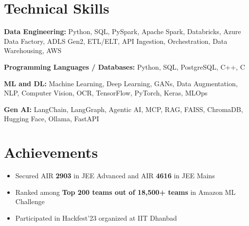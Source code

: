 \documentclass[a4paper,10pt]{article}
\begin{document}
\section{Technical Skills}

\small
\textbf{Data Engineering:}
Python, SQL, PySpark, Apache Spark, Databricks, Azure Data Factory, ADLS Gen2, ETL/ELT, API Ingestion, Orchestration, Data Warehousing, AWS

\vspace{2pt}

\textbf{Programming Languages / Databases:}
Python, SQL, PostgreSQL, C++, C

\vspace{2pt}

\textbf{ML and DL:}
Machine Learning, Deep Learning, GANs, Data Augmentation, NLP, Computer Vision, OCR, TensorFlow, PyTorch, Keras, MLOps

\vspace{2pt}

\textbf{Gen AI:}
LangChain, LangGraph, Agentic AI, MCP, RAG, FAISS, ChromaDB, Hugging Face, Ollama, FastAPI

\section{Achievements}

\begin{itemize}[leftmargin=0.18in,itemsep=2pt]
\item Secured AIR \textbf{2903} in JEE Advanced and AIR \textbf{4616} in JEE Mains
\item Ranked among \textbf{Top 200 teams out of 18,500+ teams} in Amazon ML Challenge
\item Participated in Hackfest'23 organized at IIT Dhanbad
\end{itemize}
\end{document}
